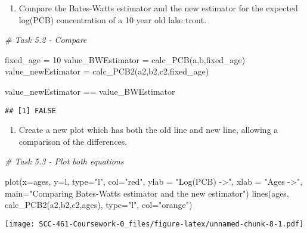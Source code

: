 \documentclass[
]{article}
\newenvironment{Shaded}{\begin{snugshade}}{\end{snugshade}}
\newcommand{\AttributeTok}[1]{\textcolor[rgb]{0.77,0.63,0.00}{#1}}
\newcommand{\CommentTok}[1]{\textcolor[rgb]{0.56,0.35,0.01}{\textit{#1}}}
\newcommand{\DecValTok}[1]{\textcolor[rgb]{0.00,0.00,0.81}{#1}}
\newcommand{\FunctionTok}[1]{\textcolor[rgb]{0.00,0.00,0.00}{#1}}
\newcommand{\NormalTok}[1]{#1}
\newcommand{\OtherTok}[1]{\textcolor[rgb]{0.56,0.35,0.01}{#1}}
\newcommand{\SpecialCharTok}[1]{\textcolor[rgb]{0.00,0.00,0.00}{#1}}
\newcommand{\StringTok}[1]{\textcolor[rgb]{0.31,0.60,0.02}{#1}}
\providecommand{\tightlist}{%
  \setlength{\itemsep}{0pt}\setlength{\parskip}{0pt}}
\begin{document}
\begin{enumerate}
\def\labelenumi{(\alph{enumi})}
\setcounter{enumi}{1}
\tightlist
\item
  Compare the Bates-Watts estimator and the new estimator for the
  expected log(PCB) concentration of a 10 year old lake trout.
\end{enumerate}

\begin{Shaded}
\begin{Highlighting}[]
\CommentTok{\# Task 5.2 {-} Compare}

\NormalTok{fixed\_age }\OtherTok{=} \DecValTok{10}
\NormalTok{value\_BWEstimator }\OtherTok{=} \FunctionTok{calc\_PCB}\NormalTok{(a,b,fixed\_age)}
\NormalTok{value\_newEstimator }\OtherTok{=} \FunctionTok{calc\_PCB2}\NormalTok{(a2,b2,c2,fixed\_age)}

\NormalTok{value\_newEstimator }\SpecialCharTok{==}\NormalTok{ value\_BWEstimator}
\end{Highlighting}
\end{Shaded}

\begin{verbatim}
## [1] FALSE
\end{verbatim}

\begin{enumerate}
\def\labelenumi{(\alph{enumi})}
\setcounter{enumi}{2}
\tightlist
\item
  Create a new plot which has both the old line and new line, allowing a
  comparison of the differences.
\end{enumerate}

\begin{Shaded}
\begin{Highlighting}[]
\CommentTok{\# Task 5.3 {-} Plot both equations}

\FunctionTok{plot}\NormalTok{(}\AttributeTok{x=}\NormalTok{ages, }\AttributeTok{y=}\NormalTok{l, }\AttributeTok{type=}\StringTok{"l"}\NormalTok{, }\AttributeTok{col=}\StringTok{"red"}\NormalTok{, }\AttributeTok{ylab =} \StringTok{"Log(PCB) {-}\textgreater{}"}\NormalTok{, }\AttributeTok{xlab =} \StringTok{"Ages {-}\textgreater{}"}\NormalTok{, }
     \AttributeTok{main=}\StringTok{"Comparing Bates{-}Watts estimator and the new estimator"}\NormalTok{)}
\FunctionTok{lines}\NormalTok{(ages, }\FunctionTok{calc\_PCB2}\NormalTok{(a2,b2,c2,ages), }\AttributeTok{type=}\StringTok{"l"}\NormalTok{, }\AttributeTok{col=}\StringTok{"orange"}\NormalTok{)}
\end{Highlighting}
\end{Shaded}

\texttt{[image: SCC-461-Coursework-0\_files/figure-latex/unnamed-chunk-8-1.pdf]}
\end{document}
